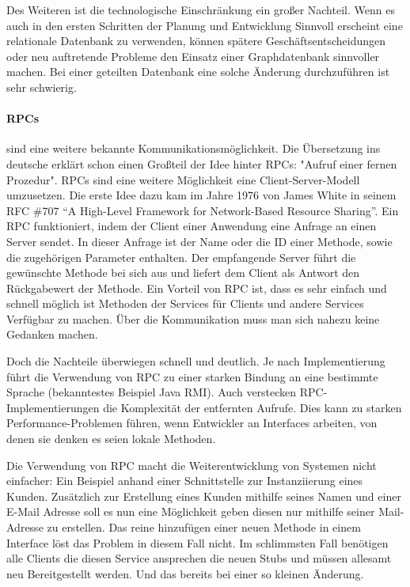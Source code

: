 \documentclass[12pt,a4paper,bibliography=totocnumbered,listof=totocnumbered]{scrartcl}
\begin{document}
Des Weiteren ist die technologische Einschränkung ein großer Nachteil. Wenn es auch in den ersten Schritten der Planung und Entwicklung Sinnvoll erscheint eine relationale Datenbank zu verwenden, können spätere Geschäftsentscheidungen oder neu auftretende Probleme den Einsatz einer Graphdatenbank sinnvoller machen. Bei einer geteilten Datenbank eine solche Änderung durchzuführen ist sehr schwierig\cite[S.85]{buildingms}.

\paragraph{\acfp{RPC}}\label{rpcpara} sind eine weitere bekannte Kommunikationsmöglichkeit. Die Übersetzung ins deutsche erklärt schon einen Großteil der Idee hinter \acp{RPC}: "Aufruf einer fernen Prozedur". \acp{RPC} sind eine weitere Möglichkeit eine Client-Server-Modell umzusetzen. Die erste Idee dazu kam im Jahre 1976 von James White in seinem RFC \#707 \enquote{A High-Level Framework for Network-Based Resource Sharing}\cite{white707}. Ein \ac{RPC} funktioniert, indem der Client einer Anwendung eine Anfrage an einen Server sendet. In dieser Anfrage ist der Name oder die ID einer Methode, sowie die zugehörigen Parameter enthalten. Der empfangende Server führt die gewünschte Methode bei sich aus und liefert dem Client als Antwort den Rückgabewert der Methode.
Ein Vorteil von RPC ist, dass es sehr einfach und schnell möglich ist Methoden der Services für Clients und andere Services Verfügbar zu machen. Über die Kommunikation muss man sich nahezu keine Gedanken machen\cite[S.91]{buildingms}.


Doch die Nachteile überwiegen schnell und deutlich. Je nach Implementierung führt die Verwendung von RPC zu einer starken Bindung an eine bestimmte Sprache (bekanntestes Beispiel Java RMI). Auch verstecken RPC-Implementierungen die Komplexität der entfernten Aufrufe. Dies kann zu starken Performance-Problemen führen, wenn Entwickler an Interfaces arbeiten, von denen sie denken es seien lokale Methoden\cite[S.93]{buildingms}.

Die Verwendung von RPC macht die Weiterentwicklung von Systemen nicht einfacher: Ein Beispiel anhand einer Schnittstelle zur Instanziierung eines Kunden. Zusätzlich zur Erstellung eines Kunden mithilfe seines Namen und einer E-Mail Adresse soll es nun eine Möglichkeit geben diesen nur mithilfe seiner Mail-Adresse zu erstellen. Das reine hinzufügen einer neuen Methode in einem Interface löst das Problem in diesem Fall nicht. Im schlimmsten Fall benötigen alle Clients die diesen Service ansprechen die neuen Stubs und müssen allesamt neu Bereitgestellt werden\cite[S.94]{buildingms}. Und das bereits bei einer so kleinen Änderung.
\end{document}
